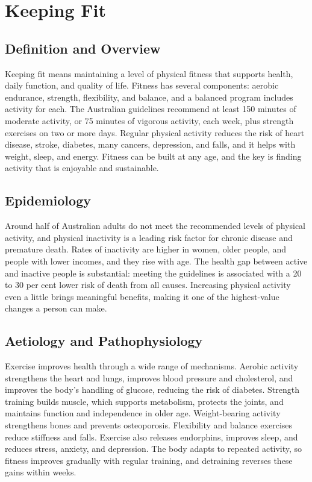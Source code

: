 \chapter{Keeping Fit}

\section*{Definition and Overview}
Keeping fit means maintaining a level of physical fitness that supports health, daily function, and quality of life. Fitness has several components: aerobic endurance, strength, flexibility, and balance, and a balanced program includes activity for each. The Australian guidelines recommend at least 150 minutes of moderate activity, or 75 minutes of vigorous activity, each week, plus strength exercises on two or more days. Regular physical activity reduces the risk of heart disease, stroke, diabetes, many cancers, depression, and falls, and it helps with weight, sleep, and energy. Fitness can be built at any age, and the key is finding activity that is enjoyable and sustainable.

\section*{Epidemiology}
Around half of Australian adults do not meet the recommended levels of physical activity, and physical inactivity is a leading risk factor for chronic disease and premature death. Rates of inactivity are higher in women, older people, and people with lower incomes, and they rise with age. The health gap between active and inactive people is substantial: meeting the guidelines is associated with a 20 to 30 per cent lower risk of death from all causes. Increasing physical activity even a little brings meaningful benefits, making it one of the highest-value changes a person can make.

\section*{Aetiology and Pathophysiology}
Exercise improves health through a wide range of mechanisms. Aerobic activity strengthens the heart and lungs, improves blood pressure and cholesterol, and improves the body's handling of glucose, reducing the risk of diabetes. Strength training builds muscle, which supports metabolism, protects the joints, and maintains function and independence in older age. Weight-bearing activity strengthens bones and prevents osteoporosis. Flexibility and balance exercises reduce stiffness and falls. Exercise also releases endorphins, improves sleep, and reduces stress, anxiety, and depression. The body adapts to repeated activity, so fitness improves gradually with regular training, and detraining reverses these gains within weeks.

